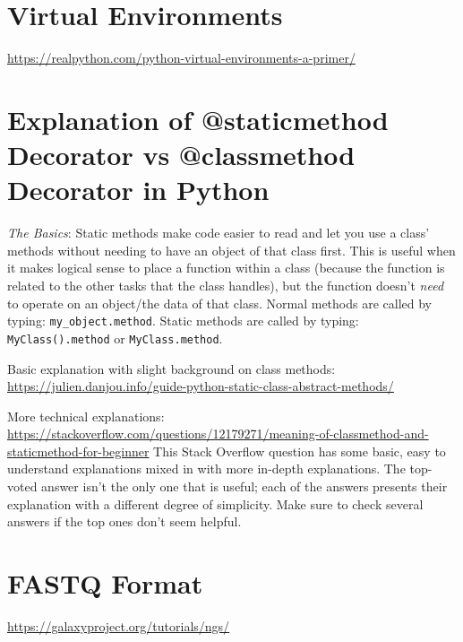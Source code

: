 \begin{fullpage}
    
    \section{Virtual Environments}
    \label{appendix:virtual-environments}
    \url{https://realpython.com/python-virtual-environments-a-primer/}


    \section{Explanation of @staticmethod Decorator vs @classmethod Decorator in Python}
    \label{app:static-method}
    \textit{The Basics}: Static methods make code easier to read and let you use a class' methods without needing to have an object of that class first. This is useful when it makes logical sense to place a function within a class (because the function is related to the other tasks that the class handles), but the function doesn't \textit{need} to operate on an object/the data of that class. Normal methods are called by typing: \verb|my_object.method|. Static methods are called by typing: \verb|MyClass().method| or \verb|MyClass.method|.
    
    Basic explanation with slight background on class methods: 
    \newline
    \url{https://julien.danjou.info/guide-python-static-class-abstract-methods/}

    More technical explanations: 
    \newline
    \url{https://stackoverflow.com/questions/12179271/meaning-of-classmethod-and-staticmethod-for-beginner}
    This Stack Overflow question has some basic, easy to understand explanations mixed in with more in-depth explanations. The top-voted answer isn't the only one that is useful; each of the answers presents their explanation with a different degree of simplicity. Make sure to check several answers if the top ones don't seem helpful. 
    
    
    \section{FASTQ Format}
    \label{app:fastq-format}
    \url{https://galaxyproject.org/tutorials/ngs/}
    

\end{fullpage}
